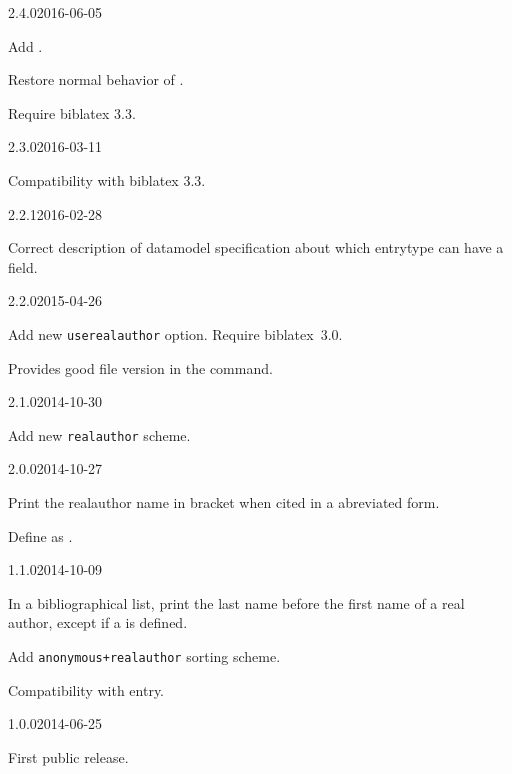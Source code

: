 \documentclass{ltxdockit}[2011/03/25]
\newcommand{\biblatex}{biblatex\xspace}
\begin{document}
\begin{changelog}

  \begin{release}{2.4.0}{2016-06-05}
    \item Add .
    \item Restore normal behavior of .
    \item Require biblatex 3.3.
  \end{release}

  \begin{release}{2.3.0}{2016-03-11}
  \item Compatibility with biblatex 3.3.
  \end{release}

  \begin{release}{2.2.1}{2016-02-28}
  \item Correct description of datamodel specification about which entrytype can have a  field.
  \end{release}


  \begin{release}{2.2.0}{2015-04-26}
  \item Add new \verb|userealauthor| option. Require \biblatex~3.0. 
  \item Provides good file version in the  command.
  \end{release}

  \begin{release}{2.1.0}{2014-10-30}
  \item Add new \verb|realauthor| scheme. 
  \end{release}


  \begin{release}{2.0.0}{2014-10-27}
  \item Print the realauthor name in bracket when cited in a abreviated form.
  \item Define  as . 
  \end{release}

\begin{release}{1.1.0}{2014-10-09}
\item In a bibliographical list, print the last name before the first name of a real author, except if a  is defined.
\item Add \verb|anonymous+realauthor| sorting scheme.   
\item Compatibility with  entry. 
\end{release}

\begin{release}{1.0.0}{2014-06-25}
\item First public release.
\end{release}
\end{changelog}
\end{document}
